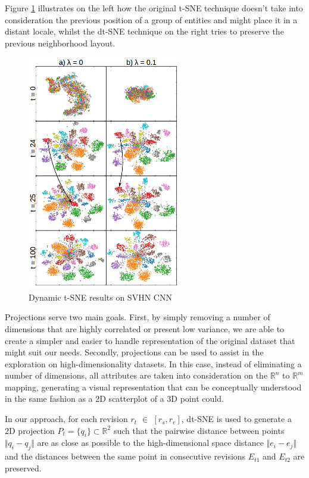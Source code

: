 Figure \ref{fig:dtsne} illustrates on the left how the original t-SNE technique doesn't take into consideration the previous position of a group of entities and might place it in a distant locale, whilst the dt-SNE technique on the right tries to preserve the previous neighborhood layout.
\begin{figure}[H]
  \centering
  \includegraphics[width=0.6\textwidth]{figures/dtsne.png}
  \caption{Dynamic t-SNE results on SVHN CNN}
  \label{fig:dtsne}
\end{figure}

Projections serve two main goals. First, by simply removing a number of dimensions that are highly correlated or present low variance, we are able to create a simpler and easier to handle representation of the original dataset that might suit our needs. Secondly, projections can be used to assist in the exploration on high-dimensionality datasets. In this case, instead of eliminating a number of dimensions, all attributes are taken into consideration on the ${\mathbb{R}^{n}}$ to ${\mathbb{R}^{m}}$ mapping, generating a visual representation that can be conceptually understood in the same fashion as a 2D scatterplot of a 3D point could.

In our approach, for each revision $r_{t}$ $\in$ $[r_{s}, r_{e}]$, dt-SNE is used to generate a 2D projection $P_{t} = \{q_{i} \} \subset{\mathbb{R}^{2}}$ such that the pairwise distance between points $\Vert q_{i} - q_{j} \Vert$ are as close as possible to the high-dimensional space distance $\Vert e_{i} - e_{j} \Vert$ and the distances between the same point in consecutive revisions $E_{t1}$ and $E_{t2}$ are preserved. 
